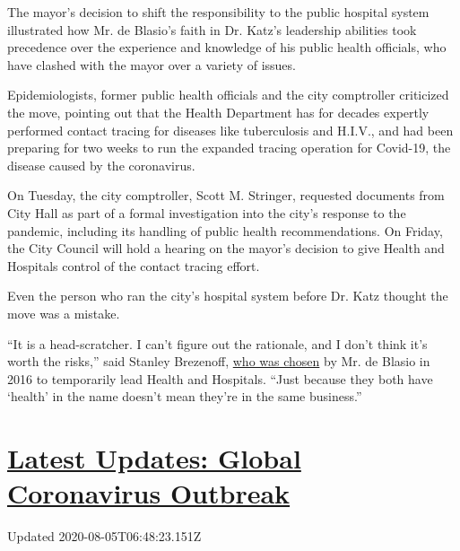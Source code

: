 The mayor's decision to shift the responsibility to the public hospital
system illustrated how Mr. de Blasio's faith in Dr. Katz's leadership
abilities took precedence over the experience and knowledge of his
public health officials, who have clashed with the mayor over a variety
of issues.

Epidemiologists, former public health officials and the city comptroller
criticized the move, pointing out that the Health Department has for
decades expertly performed contact tracing for diseases like
tuberculosis and H.I.V., and had been preparing for two weeks to run the
expanded tracing operation for Covid-19, the disease caused by the
coronavirus.

On Tuesday, the city comptroller, Scott M. Stringer, requested documents
from City Hall as part of a formal investigation into the city's
response to the pandemic, including its handling of public health
recommendations. On Friday, the City Council will hold a hearing on the
mayor's decision to give Health and Hospitals control of the contact
tracing effort.

Even the person who ran the city's hospital system before Dr. Katz
thought the move was a mistake.

``It is a head-scratcher. I can't figure out the rationale, and I don't
think it's worth the risks,'' said Stanley Brezenoff,
\href{https://www.nytimes.com/2016/11/08/nyregion/chief-of-new-yorks-struggling-public-hospital-system-is-resigning.html}{who
was chosen} by Mr. de Blasio in 2016 to temporarily lead Health and
Hospitals. ``Just because they both have `health' in the name doesn't
mean they're in the same business.''

\hypertarget{latest-updates-global-coronavirus-outbreak}{%
\section{\texorpdfstring{\href{https://www.nytimes.com/2020/08/04/world/coronavirus-cases.html?action=click\&pgtype=Article\&state=default\&region=MAIN_CONTENT_1\&context=storylines_live_updates}{Latest
Updates: Global Coronavirus
Outbreak}}{Latest Updates: Global Coronavirus Outbreak}}\label{latest-updates-global-coronavirus-outbreak}}

Updated 2020-08-05T06:48:23.151Z

